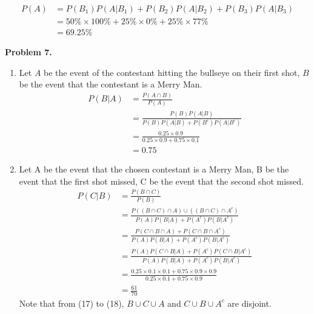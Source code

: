 \documentclass{article}
\begin{document}
\begin{align}
    P(A) & = P(B_1)P(A | B_1) + P(B_2)P(A | B_2) + P(B_3)P(A | B_3) \\
    & = 50\% \times 100\% + 25\% \times 0\% + 25\% \times 77\% \\
    & = 69.25\%
\end{align}
\pagebreak

\textbf{Problem 7.}
\begin{enumerate}[label={(\alph*)}]
    \item 
    Let $A$ be the event of the contestant hitting the bullseye on their first shot, $B$ be the event that the contestant is a Merry Man.
    \begin{align}
        P(B | A) & = \frac{P(A \cap B)}{P(A)} \\
        & = \frac{P(B)P(A|B)}{P(B)P(A | B) + P(B^c)P(A | B^c)} \\
        & = \frac{0.25 \times 0.9}{0.25 \times 0.9 + 0.75 \times 0.1} \\
        & = 0.75
    \end{align}

    \item 
    Let A be the event that the chosen contestant is a Merry Man, B be the event that the first shot missed, C be the event that the second shot missed.
    \begin{align}
        P(C|B) & = \frac{P(B \cap C)}{P(B)} \\
        & = \frac{P((B \cap C) \cap A) \cup ((B \cap C) \cap A^c)}{P(A)P(B|A) + P(A^c)P(B|A^c)} \\
        & = \frac{P(C \cap B \cap A) + P(C \cap B \cap A^c)}{P(A)P(B|A) + P(A^c)P(B|A^c)} \\
        & = \frac{P(A)P(C \cap B | A) + P(A^c)P(C \cap B | A^c)}{P(A)P(B|A) + P(A^c)P(B|A^c)} \\ 
        & = \frac{0.25 \times 0.1 \times 0.1 + 0.75 \times 0.9 \times 0.9}{0.25 \times 0.1 + 0.75 \times 0.9} \\
        & = \frac{61}{70}
    \end{align}
    Note that from (17) to (18), $B \cup C \cup A$ and $C \cup B \cup A^c$ are disjoint.
\end{enumerate}
\end{document}
